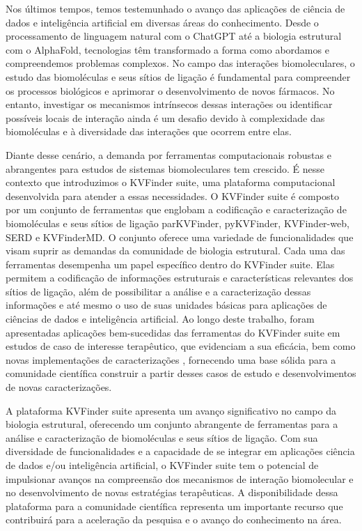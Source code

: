 \documentclass[Portugues]{phdquali}
\begin{document}
\begin{resumo}

Nos últimos tempos, temos testemunhado o avanço das aplicações de ciência de dados e inteligência artificial  em diversas áreas do conhecimento. Desde o processamento de linguagem natural com o ChatGPT até a biologia estrutural com o AlphaFold,  tecnologias  têm transformado a forma como abordamos e compreendemos problemas complexos. No campo das interações biomoleculares, o estudo das biomoléculas e seus sítios de ligação é fundamental para compreender os processos biológicos e aprimorar o desenvolvimento de novos fármacos. No entanto, investigar os mecanismos intrínsecos dessas interações ou identificar possíveis locais de interação ainda é um desafio devido à complexidade das biomoléculas e à diversidade das interações que ocorrem entre elas. 

Diante desse cenário, a demanda por ferramentas computacionais robustas e abrangentes para estudos de sistemas biomoleculares tem crescido. É nesse contexto que introduzimos o KVFinder suite, uma plataforma computacional desenvolvida para atender a essas necessidades. O KVFinder suite é composto por um conjunto de ferramentas que englobam a codificação e caracterização de biomoléculas e seus sítios de ligação  parKVFinder, pyKVFinder, KVFinder-web, SERD e KVFinderMD. O conjunto oferece uma variedade de funcionalidades que visam suprir as demandas da comunidade de biologia estrutural. Cada uma das ferramentas desempenha um papel específico dentro do KVFinder suite. Elas permitem a codificação de informações estruturais e características relevantes dos sítios de ligação, além de possibilitar a análise e a caracterização dessas informações e até mesmo o uso de suas unidades básicas para aplicações de ciências de dados e inteligência artificial. Ao longo deste trabalho, foram apresentadas aplicações bem-sucedidas das ferramentas do KVFinder suite em estudos de caso de interesse terapêutico, que evidenciam a sua eficácia, bem como novas implementações de caracterizações , fornecendo uma base sólida para a comunidade científica construir a partir desses casos de estudo e desenvolvimentos de novas caracterizações.

A plataforma KVFinder suite apresenta um avanço significativo no campo da biologia  estrutural, oferecendo um conjunto abrangente de ferramentas  para a análise e caracterização de biomoléculas e seus sítios de ligação. Com sua diversidade de funcionalidades e a capacidade de se integrar em aplicações ciência de dados e/ou inteligência artificial, o KVFinder suite tem o potencial de impulsionar avanços na compreensão dos mecanismos de interação biomolecular e no desenvolvimento de novas estratégias terapêuticas. A disponibilidade dessa plataforma para a comunidade científica representa um importante recurso que contribuirá para a aceleração da pesquisa e o avanço do conhecimento na área.

\end{resumo}
\end{document}
